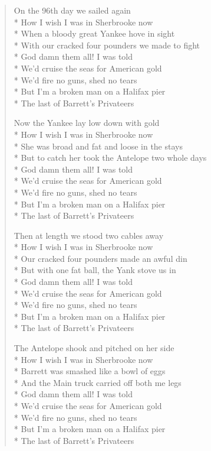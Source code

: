 \documentclass[9pt,twoside]{extarticle}
\newenvironment{xverse}{
	\begin{verse}
	\fontsize{8.5}{10.5}\selectfont
	}
	{
	\end{verse}
	\penalty 0
}
\begin{document}
\begin{xverse}
On the 96th day we sailed again \\*
How I wish I was in Sherbrooke now \\*
When a bloody great Yankee hove in sight \\*
With our cracked four pounders we made to fight \\*
God damn them all! I was told \\*
We’d cruise the seas for American gold \\*
We’d fire no guns, shed no tears \\*
But I’m a broken man on a Halifax pier \\*
The last of Barrett’s Privateers

Now the Yankee lay low down with gold \\*
How I wish I was in Sherbrooke now \\*
She was broad and fat and loose in the stays \\*
But to catch her took the Antelope two whole days \\*
God damn them all! I was told \\*
We’d cruise the seas for American gold \\*
We’d fire no guns, shed no tears \\*
But I’m a broken man on a Halifax pier \\*
The last of Barrett’s Privateers

Then at length we stood two cables away \\*
How I wish I was in Sherbrooke now \\*
Our cracked four pounders made an awful din \\*
But with one fat ball, the Yank stove us in \\*
God damn them all! I was told \\*
We’d cruise the seas for American gold \\*
We’d fire no guns, shed no tears \\*
But I’m a broken man on a Halifax pier \\*
The last of Barrett’s Privateers

The Antelope shook and pitched on her side \\*
How I wish I was in Sherbrooke now \\*
Barrett was smashed like a bowl of eggs \\*
And the Main truck carried off both me legs \\*
God damn them all! I was told \\*
We’d cruise the seas for American gold \\*
We’d fire no guns, shed no tears \\*
But I’m a broken man on a Halifax pier \\*
The last of Barrett’s Privateers


\end{xverse}
\end{document}
